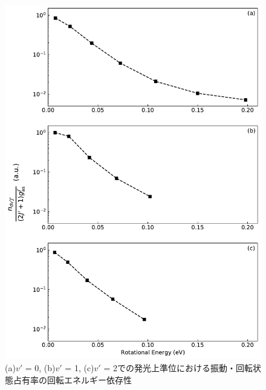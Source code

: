 \begin{figure}
    \centering
    \includegraphics[width=15cm]{pictures/upper-boltzmann-plot.pdf}
    \caption[発光上準位における振動・回転状態占有率の回転エネルギー依存性]{(a)$v'$ = 0, (b)$v'$ = 1, (c)$v'$ = 2での発光上準位における振動・回転状態占有率の回転エネルギー依存性}
    \label{fig:upper-boltzmann-plot}
\end{figure}

